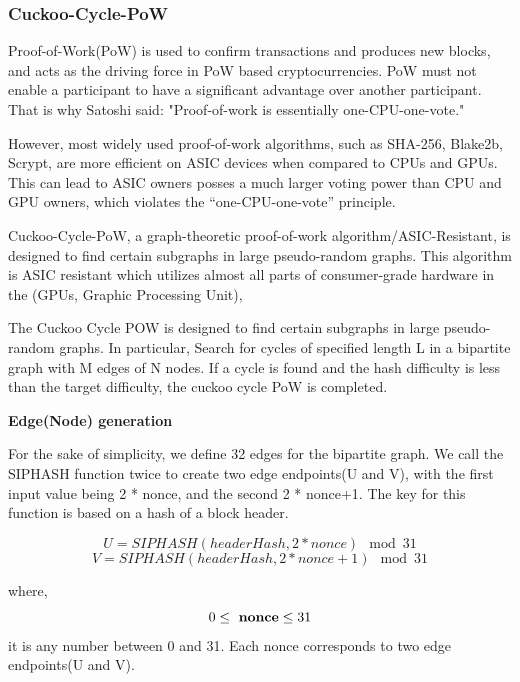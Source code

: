 \documentclass[a4paper,11pt]{article}
\begin{document}
\subsubsection{Cuckoo-Cycle-PoW}
Proof-of-Work(PoW) is used to confirm transactions and produces new blocks, and acts as the driving force in PoW based cryptocurrencies. PoW must not enable a participant to have a significant advantage over another participant. That is why Satoshi said: "Proof-of-work is essentially one-CPU-one-vote."

However, most widely used proof-of-work algorithms, such as SHA-256, Blake2b, Scrypt, are more efficient on ASIC devices when compared to CPUs and GPUs. This can lead to ASIC owners posses a much larger voting power than CPU and GPU owners, which violates the “one-CPU-one-vote” principle.

Cuckoo-Cycle-PoW, a graph-theoretic proof-of-work algorithm/ASIC-Resistant, is designed to find certain subgraphs in large pseudo-random graphs. This algorithm is ASIC resistant which  utilizes almost all parts of consumer-grade hardware in the  (GPUs, Graphic Processing Unit),

The Cuckoo Cycle POW is designed to find certain subgraphs in large pseudo-random graphs. In particular, Search for cycles of specified length L in a bipartite graph with M edges of N nodes. If a cycle is found and the hash difficulty is less than the target difficulty, the cuckoo cycle PoW is completed.




\textbf{Edge(Node) generation}

For the sake of simplicity, we define 32 edges for the bipartite graph. We call the SIPHASH function twice to create two edge endpoints(U and V), with the first input value being 2 * nonce, and the second 2 * nonce+1. The key for this function is based on a hash of a block header.

\begin{equation}
{U = SIPHASH(headerHash, 2*nonce) \mod 31}
\end{equation}
\begin{equation}
{V = SIPHASH(headerHash, 2*nonce+1) \mod 31}
\end{equation}

where,
\begin{equation}
0\leq\ {\bf nonce} \leq 31
\end{equation}it is any number between 0 and 31. Each nonce corresponds to two edge endpoints(U and V).
\end{document}
